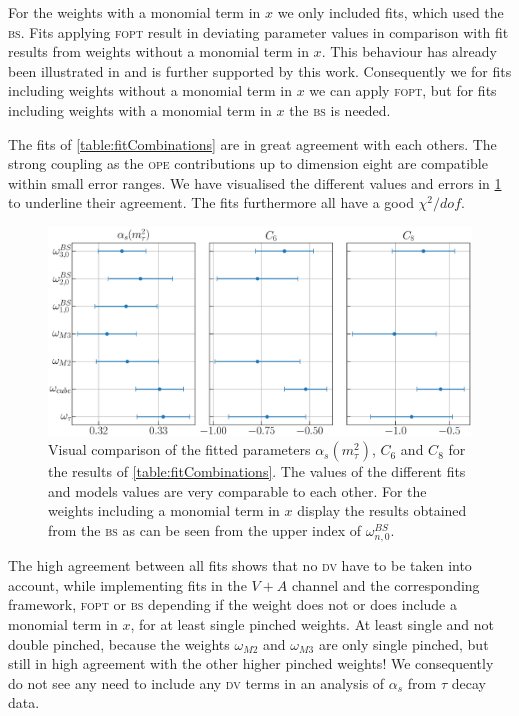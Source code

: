 \documentclass[../../index.tex]{subfiles}
\begin{document}
For the weights with a monomial term in \(x\) we only included fits, which used
the \textsc{bs}. Fits applying \textsc{fopt} result in deviating parameter
values in comparison with fit results from weights without a monomial term in
\(x\). This behaviour has already been illustrated in \cite{Beneke2012} and is
further supported by this work. Consequently we for fits including weights
without a monomial term in \(x\) we can apply \textsc{fopt}, but for fits
including weights with a monomial term in \(x\) the \textsc{bs} is needed.

The fits of \cref{table:fitCombinations} are in great agreement with each
others. The strong coupling as the \textsc{ope} contributions up to dimension
eight are compatible within small error ranges. We have visualised the different
values and errors in \cref{fig:comparisonAlC6C8} to underline their agreement.
The fits furthermore all have a good \(\chi^2/dof\).
\begin{figure}
  \centering \includegraphics[width=\textwidth]{./images/comparisonAlC6C8.eps}
  \caption{Visual comparison of the fitted parameters \(\alpha_s(m_\tau^2)\),
    \(C_6\) and \(C_8\) for the results of \cref{table:fitCombinations}. The
    values of the different fits and models values are very comparable to each
    other. For the weights including a monomial term in \(x\) display the
    results obtained from the \textsc{bs} as can be seen from the upper index of
    \(\omega_{n,0}^{BS}\).}
  \label{fig:comparisonAlC6C8}
\end{figure}

The high agreement between all fits shows that no \textsc{dv} have to be taken
into account, while implementing fits in the \(V+A\) channel and the
corresponding framework, \textsc{fopt} or \textsc{bs} depending if the weight
does not or does include a monomial term in \(x\), for at least single pinched
weights. At least single and not double pinched, because the weights
\(\omega_{M2}\) and \(\omega_{M3}\) are only single pinched, but still in high
agreement with the other higher pinched weights! We consequently do not see any
need to include any \textsc{dv} terms in an analysis of \(\alpha_s\) from
\(\tau\) decay data.
\end{document}
